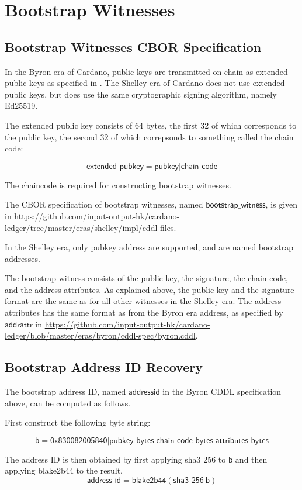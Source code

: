 \section{Bootstrap Witnesses}
\label{sec:bootstrap-witnesses}

\subsection{Bootstrap Witnesses CBOR Specification}

In the Byron era of Cardano, public keys are transmitted
on chain as extended public keys as specified in \cite{bip32}.
The Shelley era of Cardano does not use extended public keys,
but does use the same cryptographic signing algorithm,
namely Ed25519.

The extended public key consists of 64 bytes,
the first 32 of which corresponds to the public key,
the second 32 of which correpsonds to something called the chain code:

$$\mathsf{extended\_pubkey} = \mathsf{pubkey}|\mathsf{chain\_code}$$

The chaincode is required for constructing bootstrap witnesses.

The CBOR specification of bootstrap witnesses,
named $\mathsf{bootstrap\_witness}$,
is given in
\url{https://github.com/input-output-hk/cardano-ledger/tree/master/eras/shelley/impl/cddl-files}.

In the Shelley era, only pubkey address are supported,
and are named bootstrap addresses.

The bootstrap witness consists of the public key, the signature,
the chain code, and the address attributes.
As explained above, the public key and the signature format
are the same as for all other witnesses in the Shelley era.
The address attributes has the same format as from the Byron era address,
as specified by $\mathsf{addrattr}$ in
\url{https://github.com/input-output-hk/cardano-ledger/blob/master/eras/byron/cddl-spec/byron.cddl}.


\subsection{Bootstrap Address ID Recovery}

The bootstrap address ID, named $\mathsf{addressid}$ in the Byron CDDL
specification above, can be computed as follows.

First construct the following byte string:

$$\mathsf{b} =
  \mathsf{0x830082005840}
  | \mathsf{pubkey\_bytes}
  | \mathsf{chain\_code\_bytes}
  | \mathsf{attributes\_bytes}
$$

The address ID is then obtained by first applying
sha3 256 to $\mathsf{b}$ and then applying blake2b44 to the result.
$$\mathsf{address\_id} =
  \mathsf{blake2b44}(\mathsf{sha3\_256}~\mathsf{b})
$$
